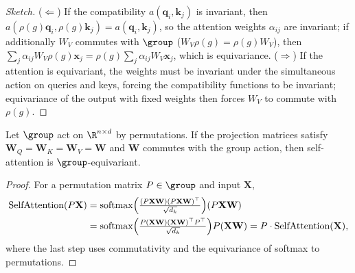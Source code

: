 \begin{proof}[Sketch]
($\Leftarrow$) If the compatibility $a(\mathbf{q}_i, \mathbf{k}_j)$ is invariant,
then $a(\rho(g)\mathbf{q}_i, \rho(g)\mathbf{k}_j) = a(\mathbf{q}_i, \mathbf{k}_j)$,
so the attention weights $\alpha_{ij}$ are invariant; if additionally $W_V$
commutes with $\group$ ($W_V \rho(g) = \rho(g) W_V$), then $\sum_j \alpha_{ij} W_V
\rho(g)\mathbf{x}_j = \rho(g) \sum_j \alpha_{ij} W_V \mathbf{x}_j$, which is
equivariance. ($\Rightarrow$) If the attention is equivariant, the weights must
be invariant under the simultaneous action on queries and keys, forcing the
compatibility functions to be invariant; equivariance of the output with fixed
weights then forces $W_V$ to commute with $\rho(g)$.
\end{proof}

\begin{lemma}
\label{lem:groups:self-attention-equivariance}
Let $\group$ act on $\R^{n \times d}$ by permutations. If the projection
matrices satisfy $\mathbf{W}_Q = \mathbf{W}_K = \mathbf{W}_V = \mathbf{W}$ and
$\mathbf{W}$ commutes with the group action, then self-attention is
$\group$-equivariant.
\end{lemma}

\begin{proof}
For a permutation matrix $P \in \group$ and input $\mathbf{X}$,
\begin{align}
  \text{SelfAttention}(P\mathbf{X})
  &= \operatorname{softmax}\!\Big(\tfrac{(P\mathbf{X}\mathbf{W})(P\mathbf{X}\mathbf{W})^\top}
     {\sqrt{d_k}}\Big)(P\mathbf{X}\mathbf{W}) \\
  &= \operatorname{softmax}\!\Big(\tfrac{P(\mathbf{X}\mathbf{W})(\mathbf{X}\mathbf{W})^\top
     P^\top}{\sqrt{d_k}}\Big)P(\mathbf{X}\mathbf{W})
   = P \cdot \text{SelfAttention}(\mathbf{X}),
\end{align}
where the last step uses commutativity and the equivariance of softmax to
permutations.
\end{proof}

